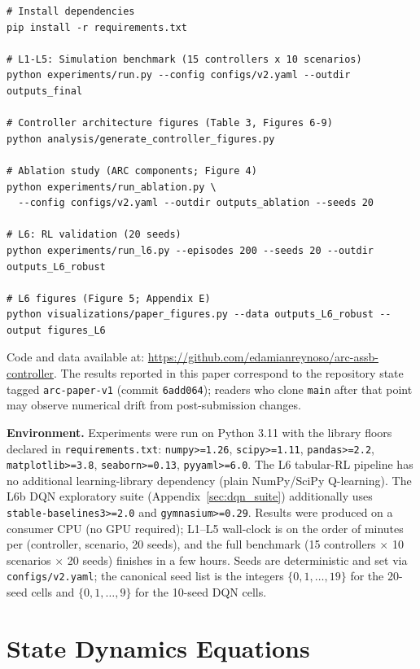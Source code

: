 \documentclass{article}
\begin{document}
\begin{verbatim}
# Install dependencies
pip install -r requirements.txt

# L1-L5: Simulation benchmark (15 controllers x 10 scenarios)
python experiments/run.py --config configs/v2.yaml --outdir outputs_final

# Controller architecture figures (Table 3, Figures 6-9)
python analysis/generate_controller_figures.py

# Ablation study (ARC components; Figure 4)
python experiments/run_ablation.py \
  --config configs/v2.yaml --outdir outputs_ablation --seeds 20

# L6: RL validation (20 seeds)
python experiments/run_l6.py --episodes 200 --seeds 20 --outdir outputs_L6_robust

# L6 figures (Figure 5; Appendix E)
python visualizations/paper_figures.py --data outputs_L6_robust --output figures_L6
\end{verbatim}

Code and data available at: \url{https://github.com/edamianreynoso/arc-assb-controller}. The results reported in this paper correspond to the repository state tagged \texttt{arc-paper-v1} (commit \texttt{6add064}); readers who clone \texttt{main} after that point may observe numerical drift from post-submission changes.

\textbf{Environment.} Experiments were run on Python 3.11 with the library floors declared in \texttt{requirements.txt}: \texttt{numpy>=1.26}, \texttt{scipy>=1.11}, \texttt{pandas>=2.2}, \texttt{matplotlib>=3.8}, \texttt{seaborn>=0.13}, \texttt{pyyaml>=6.0}. The L6 tabular-RL pipeline has no additional learning-library dependency (plain NumPy/SciPy Q-learning). The L6b DQN exploratory suite (Appendix~\ref{sec:dqn_suite}) additionally uses \texttt{stable-baselines3>=2.0} and \texttt{gymnasium>=0.29}. Results were produced on a consumer CPU (no GPU required); L1--L5 wall-clock is on the order of minutes per (controller, scenario, 20 seeds), and the full benchmark (15 controllers $\times$ 10 scenarios $\times$ 20 seeds) finishes in a few hours. Seeds are deterministic and set via \texttt{configs/v2.yaml}; the canonical seed list is the integers $\{0, 1, \ldots, 19\}$ for the 20-seed cells and $\{0, 1, \ldots, 9\}$ for the 10-seed DQN cells.

\section{State Dynamics Equations}
\end{document}
